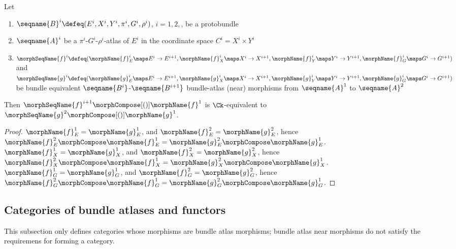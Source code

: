 \documentclass{article}
\begin{document}
\begin{lemma}
\label{lem:Bun-ATLmorphequiv}
Let
\begin{enumerate}
\item
$
  \seqname{B}^i
  \defeq
  (
    E^i,
    X^i,
    Y^i,
    \pi^i,
    G^i,
    \rho^i
  )
$, $i=1,2,$, be a protobundle
\item
$\seqname{A}^i$ be a $\pi^i$-$G^i$-$\rho^i$-atlas of $E^i$ in the coordinate space
$C^i = X^i \times Y^i$
\item
$
  \morphSeqName{f}^i \defeq
  (
    \morphName{f}^i_E \maps E^i \to E^{i+1},
    \morphName{f}^i_X \maps X^i \to X^{i+1},
    \morphName{f}^i_Y \maps Y^i \to Y^{i+1},
    \morphName{f}^i_G \maps G^i \to G^{i+1}
  )
$
and
$
  \morphSeqName{g}^i \defeq
  (
    \morphName{g}^i_E \maps E^i \to E^{i+1},
    \morphName{g}^i_X \maps X^i \to X^{i+1},
    \morphName{g}^i_Y \maps Y^i \to Y^{i+1},
    \morphName{g}^i_G \maps G^i \to G^{i+1}
  )
$
be bundle equivalent $\seqname{B^i}$-$\seqname{B^{i+1}}$ bundle-atlas
(near) morphisms from $\seqname{A}^1$ to $\seqname{A}^2$
\end{enumerate}

Then $\morphSeqName{f}^{i+1} \morphCompose[()] \morphName{f}^1$ is $\Ck$-equivalent
to $\morphSeqName{g}^2 \morphCompose[()] \morphName{g}^1$.

\begin{proof}
$\morphName{f}^1_E = \morphName{g}^1_E$, and
$\morphName{f}^2_E = \morphName{g}^2_E$, hence
$
  \morphName{f}^2_E \morphCompose \morphName{f}^1_E =
  \morphName{g}^2_E \morphCompose \morphName{g}^1_E
$.
$\morphName{f}^1_X = \morphName{g}^1_X$, and
$\morphName{f}^2_X = \morphName{g}^2_X$, hence
$
  \morphName{f}^2_X \morphCompose \morphName{f}^1_X =
  \morphName{g}^2_X \morphCompose \morphName{g}^1_X
$.
$\morphName{f}^1_G = \morphName{g}^1_G$, and
$\morphName{f}^2_G = \morphName{g}^2_G$, hence
$
  \morphName{f}^2_G \morphCompose \morphName{f}^1_G =
  \morphName{g}^2_G \morphCompose \morphName{g}^1_G
$.
\end{proof}
\end{lemma}

\subsection{Categories of bundle atlases and functors}
This subsection only defines categories whose morphisms are bundle atlas
morphisms; bundle atlas near morphisms do not satisfy the requiremens for
forming a category.
\end{document}
